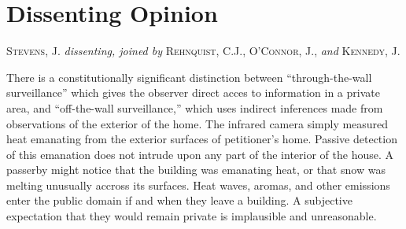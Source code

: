 \documentclass[paper=letter,fontsize=10pt]{article}
\begin{document}
\section{Dissenting Opinion}
	\noindent \textsc{Stevens, J.} \textit{dissenting, joined by } \textsc{Rehnquist, C.J., O’Connor, J.,} \textit{and} \textsc{Kennedy, J.}\par
		There is a constitutionally significant distinction between “through-the-wall surveillance” which gives the observer direct acces to information in a private area, and “off-the-wall surveillance,” which uses indirect inferences made from observations of the exterior of the home.
		The infrared camera simply measured heat emanating from the exterior surfaces of petitioner’s home.
		Passive detection of this emanation does not intrude upon any part of the interior of the house.
		A passerby might notice that the building was emanating heat, or that snow was melting unusually accross its surfaces.
		Heat waves, aromas, and other emissions enter the public domain if and when they leave a building. 
		A subjective expectation that they would remain private is implausible and unreasonable.
\end{document}
